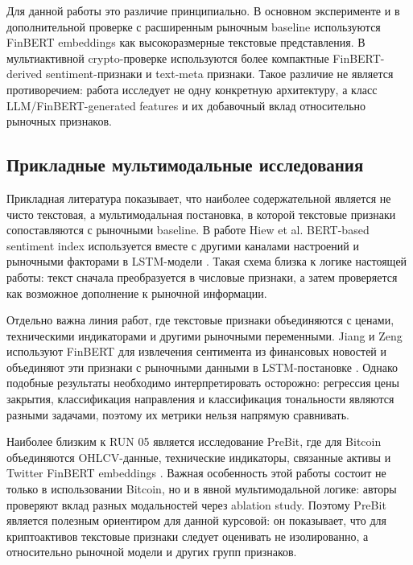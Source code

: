 Для данной работы это различие принципиально. В основном эксперименте и в дополнительной проверке с расширенным рыночным baseline используются FinBERT embeddings как высокоразмерные текстовые представления. В мультиактивной crypto-проверке используются более компактные FinBERT-derived sentiment-признаки и text-meta признаки. Такое различие не является противоречием: работа исследует не одну конкретную архитектуру, а класс LLM/FinBERT-generated features и их добавочный вклад относительно рыночных признаков.

\subsection{Прикладные мультимодальные исследования}

Прикладная литература показывает, что наиболее содержательной является не чисто текстовая, а мультимодальная постановка, в которой текстовые признаки сопоставляются с рыночными baseline. В работе Hiew et al. BERT-based sentiment index используется вместе с другими каналами настроений и рыночными факторами в LSTM-модели \cite{hiew2019bert}. Такая схема близка к логике настоящей работы: текст сначала преобразуется в числовые признаки, а затем проверяется как возможное дополнение к рыночной информации.

Отдельно важна линия работ, где текстовые признаки объединяются с ценами, техническими индикаторами и другими рыночными переменными. Jiang и Zeng используют FinBERT для извлечения сентимента из финансовых новостей и объединяют эти признаки с рыночными данными в LSTM-постановке \cite{jiang2023finbert}. Однако подобные результаты необходимо интерпретировать осторожно: регрессия цены закрытия, классификация направления и классификация тональности являются разными задачами, поэтому их метрики нельзя напрямую сравнивать.

Наиболее близким к RUN 05 является исследование PreBit, где для Bitcoin объединяются OHLCV-данные, технические индикаторы, связанные активы и Twitter FinBERT embeddings \cite{zou2022prebit}. Важная особенность этой работы состоит не только в использовании Bitcoin, но и в явной мультимодальной логике: авторы проверяют вклад разных модальностей через ablation study. Поэтому PreBit является полезным ориентиром для данной курсовой: он показывает, что для криптоактивов текстовые признаки следует оценивать не изолированно, а относительно рыночной модели и других групп признаков.

